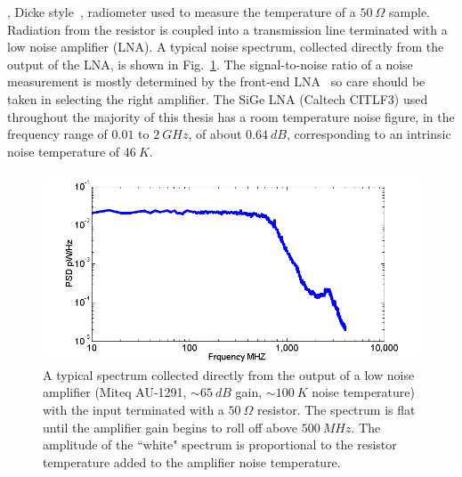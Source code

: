, Dicke style~\cite{dicke_measurement_1946}, radiometer used to measure the temperature of a $50~\Omega$ sample. Radiation from the resistor is coupled into a transmission line terminated with a low noise amplifier (LNA). A typical noise spectrum, collected directly from the output of the LNA, is shown in Fig.~\ref{fig:Miteq_spec}. The signal-to-noise ratio of a noise measurement is mostly determined by the front-end LNA~\cite{pozar_microwave_2011} so care should be taken in selecting the right amplifier. The SiGe LNA (Caltech CITLF3) used throughout the majority of this thesis has a room temperature noise figure, in the frequency range of $0.01$ to $2~GHz$, of about $0.64~dB$, corresponding to an intrinsic noise temperature of $46~K$.
\begin{figure}
\includegraphics[width=\textwidth]{figures/Johnson_noise_thermometry/Miteq_spec.png}
\caption{A typical spectrum collected directly from the output of a low noise amplifier (Miteq AU-1291, ${\sim}65~dB$ gain, ${\sim}100~K$ noise temperature) with the input terminated with a $50~\Omega$ resistor. The spectrum is flat until the amplifier gain begins to roll off above $500~MHz$. The amplitude of the ``white" spectrum is proportional to the resistor temperature added to the amplifier noise temperature.}
\label{fig:Miteq_spec}
\end{figure}

